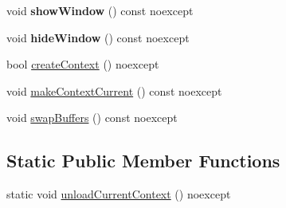 \begin{DoxyCompactItemize}
\item 
\mbox{\label{class_window_a5dc19c7cdd7c781005437eb2a55acef9}} 
void {\bfseries show\+Window} () const noexcept
\item 
\mbox{\label{class_window_a8ff16f15c65deb37e44fd1b882e37289}} 
void {\bfseries hide\+Window} () const noexcept
\item 
bool \mbox{\hyperlink{class_window_ae8f88271d37b496acde43280b8e7d99c}{create\+Context}} () noexcept
\item 
void \mbox{\hyperlink{class_window_ab217dfd20f30652a98647fec702a55a5}{make\+Context\+Current}} () const noexcept
\item 
void \mbox{\hyperlink{class_window_a838a9d28972c2c05b22ec5424a97b6b9}{swap\+Buffers}} () const noexcept
\end{DoxyCompactItemize}
\subsection*{Static Public Member Functions}
\begin{DoxyCompactItemize}
\item 
static void \mbox{\hyperlink{class_window_aa16f75d193a50d531da37508d3eb9606}{unload\+Current\+Context}} () noexcept
\end{DoxyCompactItemize}
